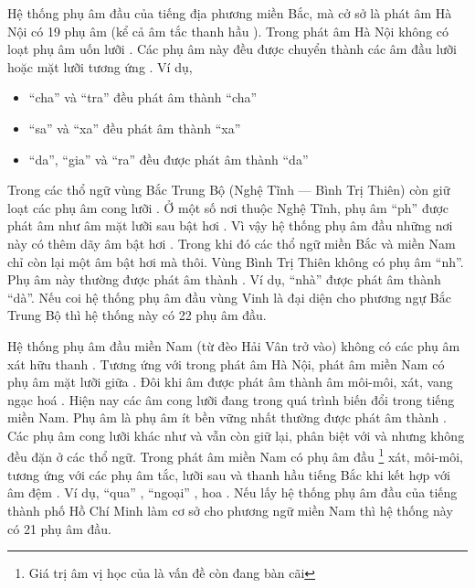 \documentclass[a4paper,oneside,14pt]{extbook} %
\begin{document}
Hệ thống phụ âm đầu của tiếng địa phương miền Bắc, mà cở sở là phát âm
Hà Nội có 19 phụ âm (kể cả âm tắc thanh hầu ). Trong phát
âm Hà Nội không có loạt phụ âm uốn lưỡi . Các
phụ âm này đều được chuyển thành các âm đầu lưỡi hoặc mặt lưỡi tương
ứng . Ví dụ,
\begin{itemize}
\item ``cha'' và ``tra'' đều phát âm thành ``cha'' 
\item ``sa'' và ``xa'' đều phát âm thành ``xa'' 
\item ``da'', ``gia'' và ``ra'' đều được phát âm thành ``da'' 
\end{itemize}

Trong các thổ ngữ vùng Bắc Trung Bộ (Nghệ Tĩnh --- Bình Trị Thiên) còn
giữ loạt các phụ âm cong lưỡi . Ở một số nơi
thuộc Nghệ Tĩnh, phụ âm ``ph'' được phát âm như âm mặt lưỡi sau bật
hơi . Vì vậy hệ thống phụ âm đầu những nơi này
có thêm dãy âm bật hơi . Trong khi đó các thổ ngữ miền Bắc và miền Nam chỉ còn
lại một âm bật hơi  mà thôi. Vùng Bình Trị Thiên
không có phụ âm ``nh''. Phụ âm này thường được phát âm thành
. Ví dụ, ``nhà'' được phát âm thành ``dà''. Nếu coi hệ
thống phụ âm đầu vùng Vinh là đại diện cho phương ngự Bắc Trung Bộ thì
hệ thống này có 22 phụ âm đầu.

Hệ thống phụ âm đầu miền Nam (từ đèo Hải Vân trở vào) không có các phụ
âm xát hữu thanh . Tương ứng với 
trong phát âm Hà Nội, phát âm miền Nam có phụ âm mặt lưỡi giữa
. Đôi khi âm  được phát âm thành âm môi-môi,
xát, vang ngạc hoá . Hiện nay các âm cong lưỡi đang
trong quá trình biến đổi trong tiếng miền Nam. Phụ âm 
là phụ âm ít bền vững nhất thường được phát âm thành
. Các phụ âm cong lưỡi khác như  và
 vẫn còn giữ lại, phân biệt với  và
 nhưng không đều đặn ở các thổ ngữ. Trong phát âm miền
Nam có phụ âm đầu \footnote{Giá trị âm vị học của
   là vấn đề còn đang bàn cãi} xát, môi-môi, tương ứng
với các phụ âm tắc, lưỡi sau và thanh hầu tiếng Bắc khi kết hợp với âm
đệm . Ví dụ, ``qua'' , ``ngoại''
, hoa . Nếu lấy hệ thống phụ âm đầu của
tiếng thành phố Hồ Chí Minh làm cơ sở cho phương ngữ miền Nam thì hệ
thống này có 21 phụ âm đầu.
\end{document}
